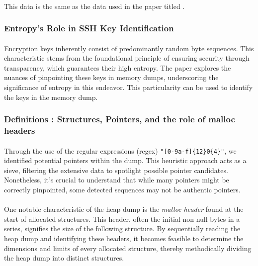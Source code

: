         \paragraph{}This data is the same as the data used in the paper titled  \cite{fellicious_smartkex_2022}.
    
    \subsubsection{Entropy's Role in SSH Key Identification}

        \paragraph{}Encryption keys\cite*{fellicious_smartkex_2022} inherently consist of predominantly random byte sequences. This characteristic stems from the foundational principle of ensuring security through transparency, which guarantees their high entropy. The paper explores the nuances of pinpointing these keys in memory dumps, underscoring the significance of entropy in this endeavor. This particularity can be used to identify the keys in the memory dump.
        
    \subsubsection{Definitions : Structures, Pointers, and the role of malloc headers}
    
        \paragraph{}Through the use of the regular expressions (\acrshort{regex}) \texttt{"[0-9a-f]\{12\}0\{4\}"}, we identified potential \glspl{pointer} within the dump. This heuristic approach acts as a sieve, filtering the extensive data to spotlight possible \gls{pointer} candidates. Nonetheless, it's crucial to understand that while many \glspl{pointer} might be correctly pinpointed, some detected sequences may not be authentic \glspl{pointer}.

        \paragraph{}One notable characteristic of the heap dump is the \textit{malloc header} found at the start of allocated \glspl{structure}. This header, often the initial non-null bytes in a series, signifies the size of the following \gls{structure}. By sequentially reading the heap dump and identifying these headers, it becomes feasible to determine the dimensions and limits of every allocated \gls{structure}, thereby methodically dividing the heap dump into distinct \glspl{structure}.
        

